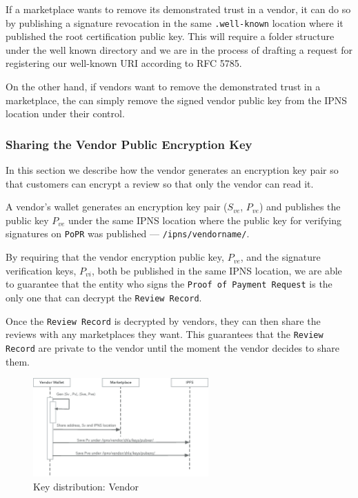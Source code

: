 \documentclass[a4paper]{article}
\begin{document}
If a marketplace wants to remove its demonstrated trust in a vendor,
it can do so by publishing a signature revocation in the same
\texttt{.well-known} location where it published the root
certification public key. This will require a folder structure under
the well known directory and we are in the process of drafting a
request for registering our well-known URI according to
RFC 5785\cite{wellknown}.

On the other hand, if vendors want to remove the demonstrated trust in
a marketplace, the can simply remove the signed vendor public key from
the IPNS location under their control.

\subsubsection{Sharing the Vendor Public Encryption Key}

In this section we describe how the vendor generates an encryption key
pair so that customers can encrypt a review so that only the vendor
can read it.

A vendor's wallet generates an encryption key pair ($S_{ve}$,
$P_{ve}$) and publishes the public key $P_{ve}$ under the same IPNS
location where the public key for verifying signatures on
\texttt{PoPR} was published --- \texttt{/ipns/vendorname/}.

By requiring that the vendor encryption public key, $P_{ve}$, and the
signature verification keys, $P_{vi}$, both be published in the same
IPNS location, we are able to guarantee that the entity who signs the
\texttt{Proof of Payment Request} is the only one that can decrypt the
\texttt{Review Record}.

Once the \texttt{Review Record} is decrypted by vendors, they can then
share the reviews with any marketplaces they want. This guarantees
that the \texttt{Review Record} are private to the vendor until the
moment the vendor decides to share them.

\begin{figure}
\centering
\includegraphics[width=0.6\textwidth]{../vendor-wallet-init.eps}
\caption{\label{fig:vendor-wallet-init}Key distribution: Vendor}
\end{figure}
\end{document}
